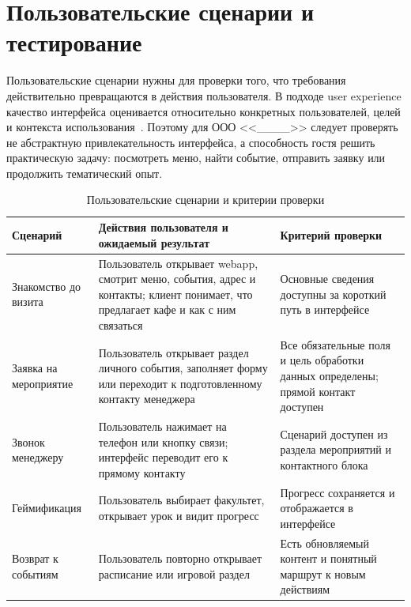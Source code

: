 \section{Пользовательские сценарии и тестирование}

Пользовательские сценарии нужны для проверки того, что требования действительно превращаются в действия пользователя. В подходе user experience качество интерфейса оценивается относительно конкретных пользователей, целей и контекста использования~\cite{norman2013,iso25010_2023}. Поэтому для ООО <<\_\_\_\_>> следует проверять не абстрактную привлекательность интерфейса, а способность гостя решить практическую задачу: посмотреть меню, найти событие, отправить заявку или продолжить тематический опыт.

\begin{table}[H]
\centering
\small
\caption{Пользовательские сценарии и критерии проверки}
\label{tab:ch3_user_scenarios}
\begin{tabularx}{\textwidth}{|>{\raggedright\arraybackslash}p{}|>{\raggedright\arraybackslash}p{}|>{\raggedright\arraybackslash}X|}
\hline
\textbf{Сценарий} & \textbf{Действия пользователя и ожидаемый результат} & \textbf{Критерий проверки} \\ \hline
Знакомство до визита & Пользователь открывает webapp, смотрит меню, события, адрес и контакты; клиент понимает, что предлагает кафе и как с ним связаться & Основные сведения доступны за короткий путь в интерфейсе \\ \hline
Заявка на мероприятие & Пользователь открывает раздел личного события, заполняет форму или переходит к подготовленному контакту менеджера & Все обязательные поля и цель обработки данных определены; прямой контакт доступен \\ \hline
Звонок менеджеру & Пользователь нажимает на телефон или кнопку связи; интерфейс переводит его к прямому контакту & Сценарий доступен из раздела мероприятий и контактного блока \\ \hline
Геймификация & Пользователь выбирает факультет, открывает урок и видит прогресс & Прогресс сохраняется и отображается в интерфейсе \\ \hline
Возврат к событиям & Пользователь повторно открывает расписание или игровой раздел & Есть обновляемый контент и понятный маршрут к новым действиям \\ \hline
\end{tabularx}
\normalsize
\end{table}

